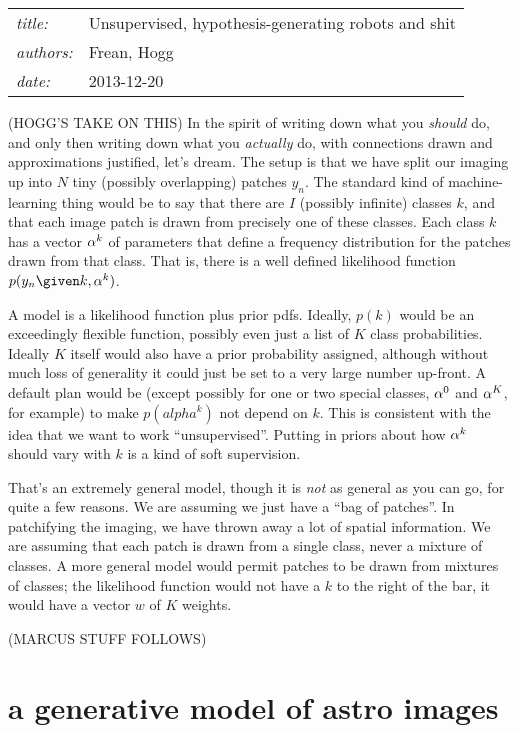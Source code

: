 \documentclass[12pt]{article}
\begin{document}
\sloppy\sloppypar

\noindent
\begin{tabular}{ll}
\textsl{title:} & Unsupervised, hypothesis-generating robots and shit \\
\textsl{authors:} & Frean, Hogg \\
\textsl{date:}    & 2013-12-20
\end{tabular}
\bigskip

(HOGG'S TAKE ON THIS)
In the spirit of writing down what you \emph{should} do,
  and only then writing down what you \emph{actually} do,
  with connections drawn and approximations justified,
  let's dream.
The setup is that we have split our imaging up into $N$ tiny
  (possibly overlapping) patches $y_n$.
The standard kind of machine-learning thing would be to
  say that there are $I$ (possibly infinite) classes $k$,
  and that each image patch is drawn from precisely one of these classes.
Each class $k$ has a vector $\mathbf{\alpha}^k$ of parameters
  that define a frequency distribution
  for the patches drawn from that class.
That is, there is a well defined likelihood function $p(y_n\given k, \balpha^k)$.

A model is a likelihood function plus prior pdfs.
Ideally, $p(k)$ would be an exceedingly flexible function,
  possibly even just a list of $K$ class probabilities.
Ideally $K$ itself would also have a prior probability assigned,
  although without much loss of generality
  it could just be set to a very large number up-front.
A default plan would be 
  (except possibly for one or two special classes,
   $\mathbf{\alpha}^0$ and $\mathbf{\alpha}^K$, for example)
  to make $p(alpha^k)$ not depend on $k$.
This is consistent with the idea that we want to work ``unsupervised''.
Putting in priors about how $\mathbf{\alpha}^k$ should vary with $k$ is a kind of soft supervision.

That's an extremely general model,
  though it is \emph{not} as general as you can go,
  for quite a few reasons.
We are assuming we just have a ``bag of patches''.
In patchifying the imaging, we have thrown away a lot of spatial information.
We are assuming that each patch is drawn from a single class,
  never a mixture of classes.
A more general model would permit patches to be drawn from mixtures of classes;
  the likelihood function would not have a $k$ to the right of the bar,
  it would have a vector $w$ of $K$ weights.

(MARCUS STUFF FOLLOWS)

\section{a generative model of astro images}
\end{document}
